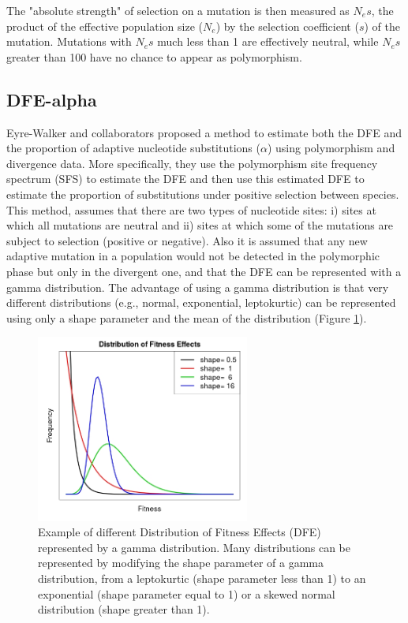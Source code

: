 The "absolute strength" of selection on a mutation is then measured as $N_{e}s$, the product of the effective population size ($N_{e}$)
by the selection coefficient ($s$)
of the mutation. Mutations with $N_{e}s$ much less than 1 are effectively neutral, while $N_{e}s$ greater than 100 have no chance to appear as polymorphism.

\subsection{DFE-alpha}

Eyre-Walker and collaborators 
	\citep{Eyre-Walker2009}
proposed a method to estimate both the DFE and the proportion of adaptive nucleotide substitutions ($\alpha$)
using polymorphism and divergence data.
More specifically, they use the polymorphism site frequency spectrum (SFS) 
to estimate the DFE and then use this estimated DFE to estimate the proportion of substitutions under positive selection between species.
This method, assumes that there are two types of nucleotide sites: 
i) sites at which all mutations are neutral and ii) sites at which some of the mutations are subject to selection (positive or negative).
Also it is assumed that any new adaptive mutation in a population would not be detected in the polymorphic phase but only in the divergent one, 
and that the DFE can be represented with a gamma distribution.
The advantage of using a gamma distribution is that very different distributions (e.g., normal, exponential, leptokurtic) can be represented using only a shape parameter and the mean of the distribution (Figure \ref{fig:Gamma}).

\begin{figure}[h]
  \includegraphics[width=7cm]{./Images/Gamma_dist.jpeg}
  \centering
  \caption{Example of different Distribution of Fitness Effects (DFE) represented by a gamma distribution.
  Many distributions can be represented by modifying the shape parameter of a gamma distribution, from
  a leptokurtic (shape parameter less than 1) to an exponential (shape parameter equal to 1) or a
  skewed normal distribution (shape  greater than 1).
   }
  \label{fig:Gamma}
\end{figure}


